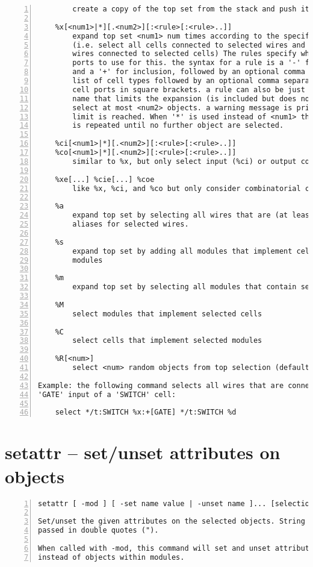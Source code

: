\begin{lstlisting}[numbers=left,frame=single]
    %c
        create a copy of the top set from the stack and push it

    %x[<num1>|*][.<num2>][:<rule>[:<rule>..]]
        expand top set <num1> num times according to the specified rules.
        (i.e. select all cells connected to selected wires and select all
        wires connected to selected cells) The rules specify which cell
        ports to use for this. the syntax for a rule is a '-' for exclusion
        and a '+' for inclusion, followed by an optional comma separated
        list of cell types followed by an optional comma separated list of
        cell ports in square brackets. a rule can also be just a cell or wire
        name that limits the expansion (is included but does not go beyond).
        select at most <num2> objects. a warning message is printed when this
        limit is reached. When '*' is used instead of <num1> then the process
        is repeated until no further object are selected.

    %ci[<num1>|*][.<num2>][:<rule>[:<rule>..]]
    %co[<num1>|*][.<num2>][:<rule>[:<rule>..]]
        similar to %x, but only select input (%ci) or output cones (%co)

    %xe[...] %cie[...] %coe
        like %x, %ci, and %co but only consider combinatorial cells

    %a
        expand top set by selecting all wires that are (at least in part)
        aliases for selected wires.

    %s
        expand top set by adding all modules that implement cells in selected
        modules

    %m
        expand top set by selecting all modules that contain selected objects

    %M
        select modules that implement selected cells

    %C
        select cells that implement selected modules

    %R[<num>]
        select <num> random objects from top selection (default 1)

Example: the following command selects all wires that are connected to a
'GATE' input of a 'SWITCH' cell:

    select */t:SWITCH %x:+[GATE] */t:SWITCH %d
\end{lstlisting}

\section{setattr -- set/unset attributes on objects}
\label{cmd:setattr}
\begin{lstlisting}[numbers=left,frame=single]
    setattr [ -mod ] [ -set name value | -unset name ]... [selection]

Set/unset the given attributes on the selected objects. String values must be
passed in double quotes (").

When called with -mod, this command will set and unset attributes on modules
instead of objects within modules.
\end{lstlisting}

